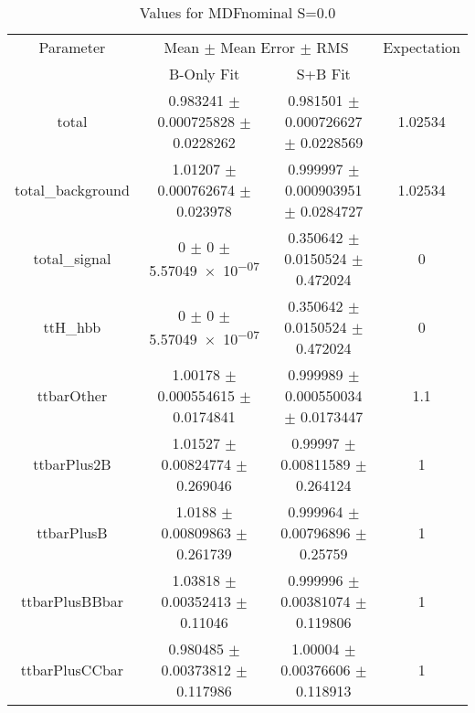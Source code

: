 \begin{table}
\centering
\caption{Values for MDFnominal S=0.0}
\begin{tabular}{cccc}
\toprule
Parameter & \multicolumn{2}{c}{Mean $\pm$ Mean Error $\pm$ RMS} & Expectation\\
 & B-Only Fit & S+B Fit & \\
\midrule
total & \num{0.983241} $\pm$ \num{0.000725828} $\pm$ \num{0.0228262} & \num{0.981501} $\pm$ \num{0.000726627} $\pm$ \num{0.0228569} & \num{1.02534}\\
total\_background & \num{1.01207} $\pm$ \num{0.000762674} $\pm$ \num{0.023978} & \num{0.999997} $\pm$ \num{0.000903951} $\pm$ \num{0.0284727} & \num{1.02534}\\
total\_signal & \num{0} $\pm$ \num{0} $\pm$ \num{5.57049e-07} & \num{0.350642} $\pm$ \num{0.0150524} $\pm$ \num{0.472024} & \num{0}\\
ttH\_hbb & \num{0} $\pm$ \num{0} $\pm$ \num{5.57049e-07} & \num{0.350642} $\pm$ \num{0.0150524} $\pm$ \num{0.472024} & \num{0}\\
ttbarOther & \num{1.00178} $\pm$ \num{0.000554615} $\pm$ \num{0.0174841} & \num{0.999989} $\pm$ \num{0.000550034} $\pm$ \num{0.0173447} & \num{1.1}\\
ttbarPlus2B & \num{1.01527} $\pm$ \num{0.00824774} $\pm$ \num{0.269046} & \num{0.99997} $\pm$ \num{0.00811589} $\pm$ \num{0.264124} & \num{1}\\
ttbarPlusB & \num{1.0188} $\pm$ \num{0.00809863} $\pm$ \num{0.261739} & \num{0.999964} $\pm$ \num{0.00796896} $\pm$ \num{0.25759} & \num{1}\\
ttbarPlusBBbar & \num{1.03818} $\pm$ \num{0.00352413} $\pm$ \num{0.11046} & \num{0.999996} $\pm$ \num{0.00381074} $\pm$ \num{0.119806} & \num{1}\\
ttbarPlusCCbar & \num{0.980485} $\pm$ \num{0.00373812} $\pm$ \num{0.117986} & \num{1.00004} $\pm$ \num{0.00376606} $\pm$ \num{0.118913} & \num{1}\\
\bottomrule
\end{tabular}
\end{table}